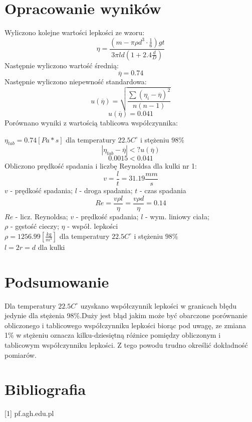 \documentclass[12pt]{article}
\begin{document}
\section{Opracowanie wyników}

Wyliczono kolejne wartości lepkości ze wzoru:
\[\eta=\frac{(m-\pi\rho d^3\cdot\frac{1}{6})gt}{3\pi ld(1+2.4\frac{d}{D})}\]
Następnie wyliczono wartość średnią:
\[{\overline{\eta} = 0.74}\]
Następnie wyliczono niepewność standardowa:
\[u(\overline{\eta})=\sqrt{\frac{\sum{{({\eta}_i-\overline{{\eta}})}^2}}{n(n-1)}}\]
\[u(\overline{\eta}) = 0.041\]
Porównano wyniki z wartością tablicowa współczynnika:
\begin{center}
 $\eta_{tab} = 0.74[Pa*s]$ dla temperatury $22.5 C^{\circ}$ i stężeniu $98\%$
 \[ |\eta_{tab} - \overline{\eta}| <? u(\overline{\eta})\]
 \[ 0.0015 < 0.041\]
 Obliczono prędkość spadania i liczbę Reynoldsa  dla kulki nr 1:
 \[v = \frac{l}{t} = 31.19\frac{mm}{s}\]
$v$ - prędkość spadania; $l$ - droga spadania; $t$ - czas spadania
\[Re = \frac{v\rho l}{\eta} =  \frac{v\rho d}{\eta}= 0.14\]
$Re$ - licz. Reynoldsa; $v$ - prędkość spadania; $l$ - wym. liniowy ciała;\\
$\rho$ - gęstość cieczy; $\eta$ - współ. lepkości\\
$\rho = 1256.99[\frac{kg}{m^3}]$ dla temperatury $22.5 C^{\circ}$ i stężeniu $98\%$\\
$l = 2r = d$ dla kulki 
\end{center}

\section{Podsumowanie}
\begin{center}
Dla temperatury $22.5C^\circ$ uzyskano współczynnik lepkości w granicach błędu jedynie dla stężenia 98\%.Duży jest błąd jakim może być obarczone porównanie  obliczonego i tablicowego współczynniku lepkości biorąc pod uwagę, ze zmiana 1\% w stężeniu oznacza kilku-dziesiętną różnice pomiędzy obliczonym i tablicowym współczynniku lepkości. Z tego powodu trudno określić dokładność pomiarów. 
\end{center}
\section{Bibliografia}
[1] pf.agh.edu.pl
\end{document}
